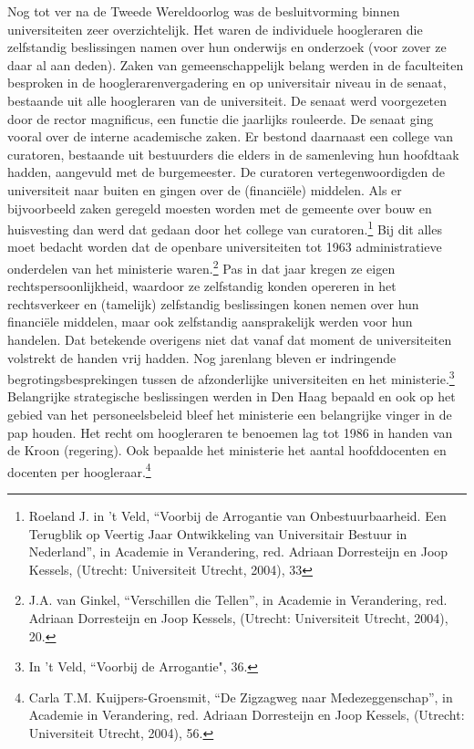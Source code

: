 \documentclass[empirical, authordate, ]{new-jote-article}
\begin{document}
	Nog tot ver na de Tweede Wereldoorlog was de besluitvorming binnen universiteiten zeer overzichtelijk. Het waren de individuele hoogleraren die zelfstandig beslissingen namen over hun onderwijs en onderzoek (voor zover ze daar al aan deden). Zaken van gemeenschappelijk belang werden in de faculteiten besproken in de hooglerarenvergadering en op universitair niveau in de senaat, bestaande uit alle hoogleraren van de universiteit. De senaat werd voorgezeten door de rector magnificus, een functie die jaarlijks rouleerde. De senaat ging vooral over de interne academische zaken. Er bestond daarnaast een college van curatoren, bestaande uit bestuurders die elders in de samenleving hun hoofdtaak hadden, aangevuld met de burgemeester. De curatoren vertegenwoordigden de universiteit naar buiten en gingen over de (financiële) middelen. Als er bijvoorbeeld zaken geregeld moesten worden met de gemeente over bouw en huisvesting dan werd dat gedaan door het college van curatoren.\footnote{Roeland J. in 't Veld, “Voorbij de Arrogantie van Onbestuurbaarheid. Een Terugblik op Veertig Jaar Ontwikkeling van Universitair Bestuur in Nederland”, in Academie in Verandering, red. Adriaan Dorresteijn en Joop Kessels, (Utrecht: Universiteit Utrecht, 2004), 33} Bij dit alles moet bedacht worden dat de openbare universiteiten tot 1963 administratieve onderdelen van het ministerie waren.\footnote{J.A. van Ginkel, “Verschillen die Tellen”, in Academie in Verandering, red. Adriaan Dorresteijn en Joop Kessels, (Utrecht: Universiteit Utrecht, 2004), 20.} Pas in dat jaar kregen ze eigen rechtspersoonlijkheid, waardoor ze zelfstandig konden opereren in het rechtsverkeer en (tamelijk) zelfstandig beslissingen konen nemen over hun financiële middelen, maar ook zelfstandig aansprakelijk werden voor hun handelen. Dat betekende overigens niet dat vanaf dat moment de universiteiten volstrekt de handen vrij hadden. Nog jarenlang bleven er indringende begrotingsbesprekingen tussen de afzonderlijke universiteiten en het ministerie.\footnote{In 't Veld, “Voorbij de Arrogantie", 36.} Belangrijke strategische beslissingen werden in Den Haag bepaald en ook op het gebied van het personeelsbeleid bleef het ministerie een belangrijke vinger in de pap houden. Het recht om hoogleraren te benoemen lag tot 1986 in handen van de Kroon (regering). Ook bepaalde het ministerie het aantal hoofddocenten en docenten per hoogleraar.\footnote{Carla T.M. Kuijpers-Groensmit, “De Zigzagweg naar Medezeggenschap”, in Academie in Verandering, red. Adriaan Dorresteijn en Joop Kessels, (Utrecht: Universiteit Utrecht, 2004), 56.}
\end{document}
